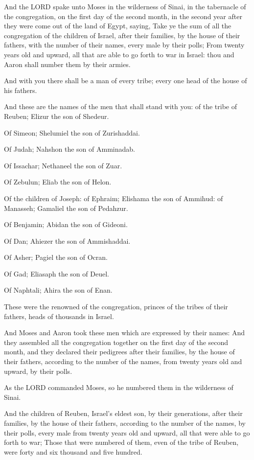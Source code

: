 \Chapter
\Verse And the LORD spake unto Moses in the wilderness of Sinai, in the
tabernacle of the congregation, on the first day of the second month,
in the second year after they were come out of the land of Egypt,
saying, \Verse Take ye the sum of all the congregation of the children of
Israel, after their families, by the house of their fathers, with the
number of their names, every male by their polls; \Verse From twenty
years old and upward, all that are able to go forth to war in Israel:
thou and Aaron shall number them by their armies.

\Verse And with you there shall be a man of every tribe; every one head
of the house of his fathers.

\Verse And these are the names of the men that shall stand with you: of
the tribe of Reuben; Elizur the son of Shedeur.

\Verse Of Simeon; Shelumiel the son of Zurishaddai.

\Verse Of Judah; Nahshon the son of Amminadab.

\Verse Of Issachar; Nethaneel the son of Zuar.

\Verse Of Zebulun; Eliab the son of Helon.

\Verse Of the children of Joseph: of Ephraim; Elishama the son of
Ammihud: of Manasseh; Gamaliel the son of Pedahzur.

\Verse Of Benjamin; Abidan the son of Gideoni.

\Verse Of Dan; Ahiezer the son of Ammishaddai.

\Verse Of Asher; Pagiel the son of Ocran.

\Verse Of Gad; Eliasaph the son of Deuel.

\Verse Of Naphtali; Ahira the son of Enan.

\Verse These were the renowned of the congregation, princes of the
tribes of their fathers, heads of thousands in Israel.

\Verse And Moses and Aaron took these men which are expressed by their
names: \Verse And they assembled all the congregation together on the
first day of the second month, and they declared their pedigrees after
their families, by the house of their fathers, according to the number
of the names, from twenty years old and upward, by their polls.

\Verse As the LORD commanded Moses, so he numbered them in the
wilderness of Sinai.

\Verse And the children of Reuben, Israel's eldest son, by their
generations, after their families, by the house of their fathers,
according to the number of the names, by their polls, every male from
twenty years old and upward, all that were able to go forth to war;
\Verse Those that were numbered of them, even of the tribe of Reuben,
were forty and six thousand and five hundred.

